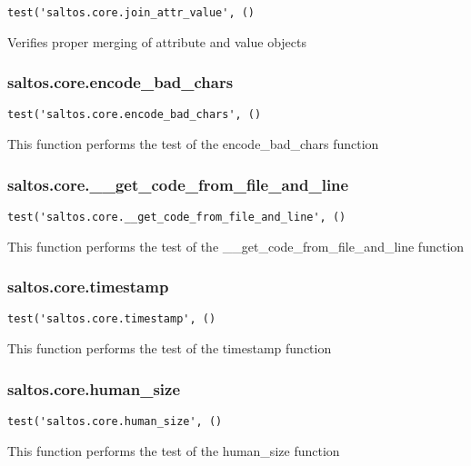 \documentclass[a4paper]{article}
\begin{document}
\begin{lstlisting}
test('saltos.core.join_attr_value', ()
\end{lstlisting}

Verifies proper merging of attribute and value objects

\hypertarget{toc97}{}
\subsubsection{saltos.core.encode\_bad\_chars}

\begin{lstlisting}
test('saltos.core.encode_bad_chars', ()
\end{lstlisting}

This function performs the test of the encode\_bad\_chars function

\hypertarget{toc98}{}
\subsubsection{saltos.core.\_\_get\_code\_from\_file\_and\_line}

\begin{lstlisting}
test('saltos.core.__get_code_from_file_and_line', ()
\end{lstlisting}

This function performs the test of the \_\_get\_code\_from\_file\_and\_line function

\hypertarget{toc99}{}
\subsubsection{saltos.core.timestamp}

\begin{lstlisting}
test('saltos.core.timestamp', ()
\end{lstlisting}

This function performs the test of the timestamp function

\hypertarget{toc100}{}
\subsubsection{saltos.core.human\_size}

\begin{lstlisting}
test('saltos.core.human_size', ()
\end{lstlisting}

This function performs the test of the human\_size function

\hypertarget{toc101}{}
\end{document}
